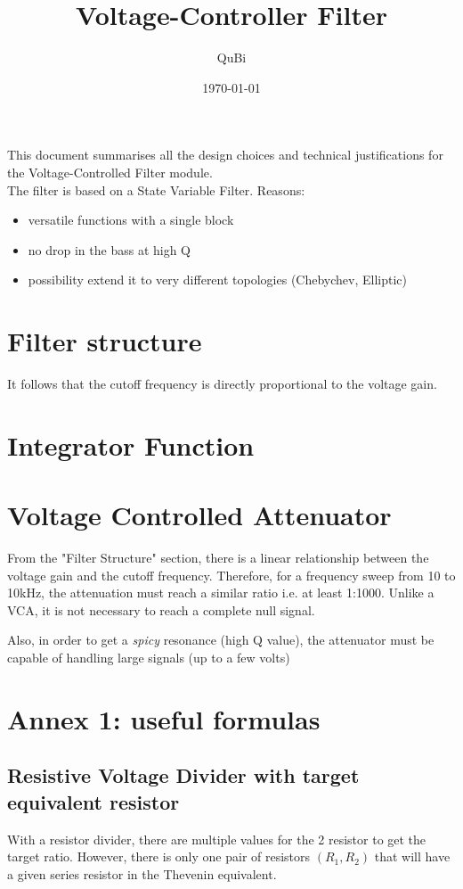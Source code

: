 \documentclass[10pt]{article}
\title{Voltage-Controller Filter}
\author{QuBi}
\date{\today}
\begin{document}
\maketitle

This document summarises all the design choices and technical justifications for the Voltage-Controlled Filter module.\\

The filter is based on a State Variable Filter.
Reasons:
\begin{itemize}
	\item versatile functions with a single block
	\item no drop in the bass at high Q
	\item possibility extend it to very different topologies (Chebychev, Elliptic)
\end{itemize}


\section*{Filter structure}

It follows that the cutoff frequency is directly proportional to the voltage gain.


\section*{Integrator Function}


\section*{Voltage Controlled Attenuator}

From the "Filter Structure" section, there is a linear relationship between the voltage gain and the cutoff frequency. Therefore, for a frequency sweep from 10 to 10kHz, the attenuation must reach a similar ratio i.e. at least 1:1000. Unlike a VCA, it is not necessary to reach a complete null signal.

Also, in order to get a \textit{spicy} resonance (high Q value), the attenuator must be capable of handling large signals (up to a few volts)

\section*{Annex 1: useful formulas}

\subsection*{Resistive Voltage Divider with target equivalent resistor}
With a resistor divider, there are multiple values for the 2 resistor to get the target ratio. 
However, there is only one pair of resistors $(R_1, R_2)$ that will have a given series resistor in the Thevenin equivalent.
\end{document}
